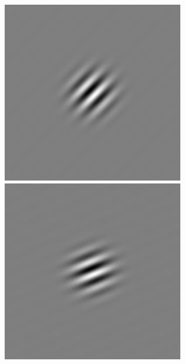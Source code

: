 \begin{figure}[ht]
\begin{center}
 \includegraphics[width=\columnwidth/9]{ch4/figures/iGabor4_2.jpg}
 \includegraphics[width=\columnwidth/9]{ch4/figures/iGabor4_3.jpg}

\end{center}
\end{figure}
